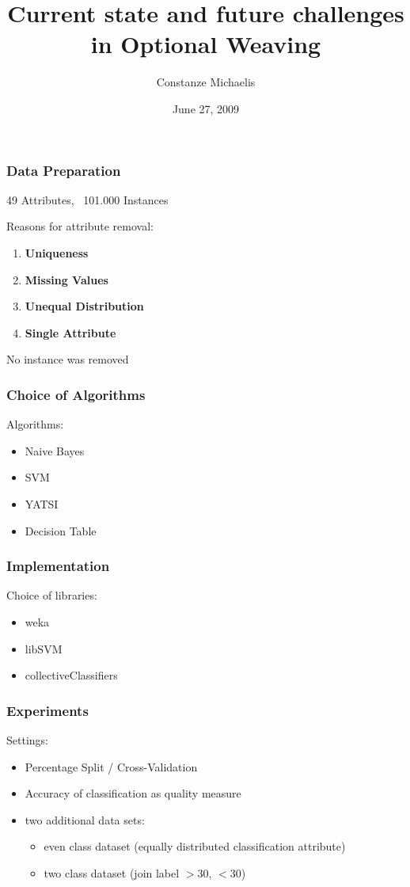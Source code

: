 \documentclass{beamer}
\title{Current state and future challenges in Optional Weaving}
\author{Constanze Michaelis}
\date{June 27, 2009}
\institute{Student Conference on Software Engineering and Database Systems}
\begin{document}
\begin{frame}[plain]
 \titlepage
\end{frame}

\begin{frame}
\frametitle{Data Preparation}

49 Attributes, ~101.000 Instances

Reasons for attribute removal:
\begin{enumerate}
\item \textbf{Uniqueness}

\item \textbf{Missing Values}

\item \textbf{Unequal Distribution}

\item \textbf{Single Attribute}
\end{enumerate}
No instance was removed
\end{frame}


\begin{frame}
\frametitle{Choice of Algorithms}
Algorithms:
\begin{itemize}
 \item Naive Bayes
 \item SVM
 \item YATSI
 \item Decision Table
\end{itemize}
\end{frame}

\begin{frame}
\frametitle{Implementation}
Choice of libraries:
\begin{itemize}
 \item weka
 \item libSVM
 \item collectiveClassifiers
\end{itemize}
\end{frame}

\begin{frame}
\frametitle{Experiments}
Settings:
\begin{itemize}
 \item Percentage Split / Cross-Validation
 \item Accuracy of classification as quality measure
 \item two additional data sets:
 \begin{itemize}
 	\item even class dataset (equally distributed classification attribute)
 	\item two class dataset (join label $>30$, $<30$)
 \end{itemize}
\end{itemize}
\end{frame}
\end{document}
